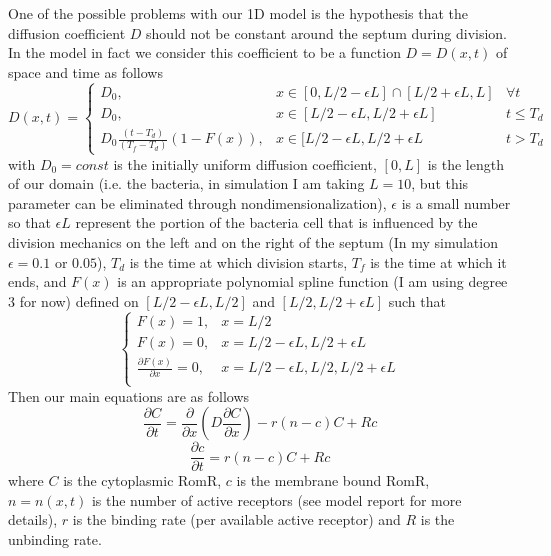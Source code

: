\documentclass{amsart}
\theoremstyle{plain}
\numberwithin{equation}{section}
\begin{document}
One of the possible problems with our 1D model is the hypothesis that the diffusion coefficient $D$ should not be constant around the septum during division. In the model in fact we consider this coefficient to be a function $D=D(x,t)$ of space and time as follows
\begin{equation}
   D(x,t) = \left\{
     \begin{array}{lcr}
       D_0,& x\in [0, L/2-\epsilon L]\cap [L/2+\epsilon L, L] & \forall t\\
       D_0,& x\in [L/2-\epsilon L,L/2+\epsilon L] & t\leq T_d\\
 D_0\frac{(t-T_d)}{(T_f-T_d)}(1-F(x)) ,& x\in [L/2-\epsilon L,L/2+\epsilon L & t>T_d

     \end{array}
   \right.
\end{equation}
with $D_0=const$ is the initially uniform diffusion coefficient, $[0,L]$ is the length of our domain (i.e. the bacteria, in simulation I am taking $L=10$, but this parameter can be eliminated through nondimensionalization), $\epsilon$ is a small number so that $\epsilon L$ represent the portion of the bacteria cell that is influenced by the division mechanics on the left and on the right of the septum (In my simulation $\epsilon=0.1$ or $0.05$), $T_d$ is the time at which division starts, $T_f$ is the time at which it ends, and $F(x)$ is an appropriate polynomial spline function (I am using degree 3 for now) defined on $[L/2-\epsilon L,L/2]$ and $[L/2,L/2+\epsilon L]$ such that
\begin{equation}
   \left\{
     \begin{array}{lr}
       F(x)=1,& x=L/2\\
       F(x)=0,& x=L/2-\epsilon L,L/2+\epsilon L\\
       \frac{\partial F(x)}{\partial x}=0,& x=L/2-\epsilon L,L/2,L/2+\epsilon L\\

     \end{array}
   \right.
\end{equation}
Then our main equations are as follows
\begin{equation}
\frac{\partial C}{\partial t}=\frac{\partial}{\partial x}(D\frac{\partial C}{\partial x})- r(n-c)C+R c
\end{equation}
\begin{equation}
\frac{\partial c}{\partial t}=r(n-c)C+R c
\end{equation}
where $C$ is the cytoplasmic RomR, $c$ is the membrane bound RomR, $n=n(x,t)$ is the number of active receptors (see model report for more details), $r$ is the binding rate (per available active receptor) and $R$ is the unbinding rate.\\
\end{document}
